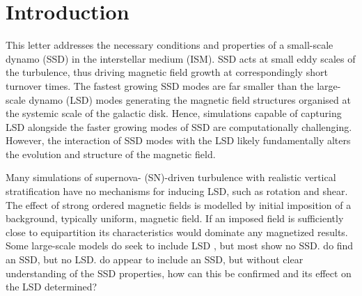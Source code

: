 \documentclass[preprint2]{aastex63}
\newcommand{\fag}[1]{\textcolor{midgreen}{FAG: #1}}
\begin{document}
\section{Introduction}\label{sec:intro}


 This letter addresses the necessary conditions and properties of a small-scale
 dynamo (SSD) in the interstellar medium (ISM).
 SSD acts at small eddy scales of the turbulence, thus driving magnetic field
 growth at correspondingly short turnover times.
 The fastest growing SSD modes are far smaller than the large-scale dynamo
 (LSD) modes generating the magnetic field structures organised at the systemic
 scale of the galactic disk.
 Hence, simulations capable of capturing LSD alongside the faster growing modes
 of SSD are computationally challenging.
 However, the interaction of SSD modes with the LSD likely fundamentally alters
 the evolution and structure of the magnetic field.

 Many simulations of supernova- (SN)-driven turbulence with realistic vertical
 stratification \citep[e.g.,][]{deAvillez:2005,PO07,Hill:2012a,HI14} have no
 mechanisms for inducing LSD, such as rotation and shear.
 The effect of strong ordered magnetic fields is modelled by initial
 imposition of a background, typically uniform, magnetic field.
 If an imposed field is sufficiently close to equipartition its characteristics
 would dominate any magnetized results.
 Some large-scale models do seek to include LSD \citep[e.g.,][]{Korpi:1999b,
 Gressel:2008,HWK09,WA09,Pakmor17,SBADMN19,GE20}, but most show no SSD.
 \citet{SBADMN19} do find an SSD, but no LSD.
 \citet{Gent:2013b,EGSFB16} do appear to include an SSD, but without clear
 understanding of the SSD properties, how can this be confirmed and its effect
 on the LSD determined?
%
     
\end{document}
